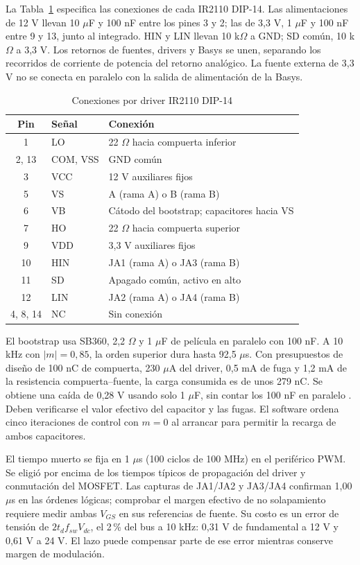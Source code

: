 \documentclass[conference]{IEEEtran}
\begin{document}
La Tabla~\ref{tab:driver} especifica las conexiones de cada IR2110 DIP-14. Las alimentaciones de 12 V llevan 10 $\mu$F y 100 nF entre los pines 3 y 2; las de 3,3 V, 1 $\mu$F y 100 nF entre 9 y 13, junto al integrado. HIN y LIN llevan 10 k$\Omega$ a GND; SD común, 10 k$\Omega$ a 3,3 V. Los retornos de fuentes, drivers y Basys se unen, separando los recorridos de corriente de potencia del retorno analógico. La fuente externa de 3,3 V no se conecta en paralelo con la salida de alimentación de la Basys.

\begin{table}[H]\caption{Conexiones por driver IR2110 DIP-14}\centering\small\setlength{\tabcolsep}{3pt}
\begin{tabular}{@{}clp{}@{}}\toprule
Pin & Señal & Conexión\\\midrule
1 & LO & 22 $\Omega$ hacia compuerta inferior\\
2, 13 & COM, VSS & GND común\\
3 & VCC & 12 V auxiliares fijos\\
5 & VS & A (rama A) o B (rama B)\\
6 & VB & Cátodo del bootstrap; capacitores hacia VS\\
7 & HO & 22 $\Omega$ hacia compuerta superior\\
9 & VDD & 3,3 V auxiliares fijos\\
10 & HIN & JA1 (rama A) o JA3 (rama B)\\
11 & SD & Apagado común, activo en alto\\
12 & LIN & JA2 (rama A) o JA4 (rama B)\\
4, 8, 14 & NC & Sin conexión\\\bottomrule
\end{tabular}\label{tab:driver}\end{table}

El bootstrap usa SB360, 2,2 $\Omega$ y 1 $\mu$F de película en paralelo con 100 nF. A 10 kHz con $|m|=0{,}85$, la orden superior dura hasta 92,5 $\mu$s. Con presupuestos de diseño de 100 nC de compuerta, 230 $\mu$A del driver, 0,5 mA de fuga y 1,2 mA de la resistencia compuerta--fuente, la carga consumida es de unos 279 nC. Se obtiene una caída de 0,28 V usando solo 1 $\mu$F, sin contar los 100 nF en paralelo \cite{an978}. Deben verificarse el valor efectivo del capacitor y las fugas. El software ordena cinco iteraciones de control con $m=0$ al arrancar para permitir la recarga de ambos capacitores.

El tiempo muerto se fija en 1 $\mu$s (100 ciclos de 100 MHz) en el periférico PWM. Se eligió por encima de los tiempos típicos de propagación del driver y conmutación del MOSFET. Las capturas de JA1/JA2 y JA3/JA4 confirman 1,00 $\mu$s en las órdenes lógicas; comprobar el margen efectivo de no solapamiento requiere medir ambas $V_{GS}$ en sus referencias de fuente. Su costo es un error de tensión de $2t_df_{sw}V_{dc}$, el 2\,\% del bus a 10 kHz: 0,31 V de fundamental a 12 V y 0,61 V a 24 V. El lazo puede compensar parte de ese error mientras conserve margen de modulación.
\end{document}
